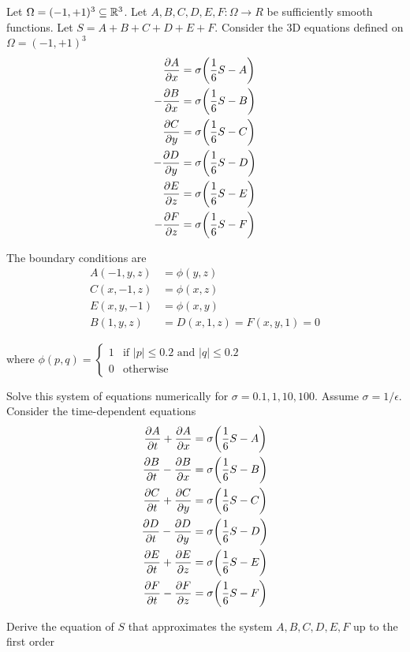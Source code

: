 \begin{problem}
	Let $\Omega = (-1, +1)^3 \subseteq \mathbb{R}^3$. Let $A, B, C, D, E, F: \Omega \to R$ be sufficiently smooth functions. Let $S = A + B + C + D + E + F$. Consider the 3D equations defined on $\Omega = (-1, +1)^3$
	\begin{align*}
		\frac{\partial A}{\partial x} &= \sigma \tuple*{\frac{1}{6} S - A} \\
		- \frac{\partial B}{\partial x} &= \sigma \tuple*{\frac{1}{6} S - B} \\
		\frac{\partial C}{\partial y} &= \sigma \tuple*{\frac{1}{6} S - C} \\
		- \frac{\partial D}{\partial y} &= \sigma \tuple*{\frac{1}{6} S - D} \\
		\frac{\partial E}{\partial z} &= \sigma \tuple*{\frac{1}{6} S - E} \\
		- \frac{\partial F}{\partial z} &= \sigma \tuple*{\frac{1}{6} S - F}
	\end{align*}
	
	The boundary conditions are 
	\begin{align*}
		A(-1, y, z) &= \phi(y, z) \\
		C(x, -1, z) &= \phi(x, z) \\
		E(x, y, -1) &= \phi(x, y) \\
		B(1, y, z) &= D(x, 1, z) = F(x, y, 1) = 0
	\end{align*}
	
	where $\phi(p, q) = \begin{cases}
		1 &\text{if $|p| \leq 0.2$ and $|q| \leq 0.2$} \\
		0 &\text{otherwise}
	\end{cases}$

	Solve this system of equations numerically for $\sigma = 0.1, 1, 10, 100$. Assume $\sigma = 1/\epsilon$. Consider the time-dependent equations
	\begin{align*}
		\frac{\partial A}{\partial t} + \frac{\partial A}{\partial x} &= \sigma \tuple*{\frac{1}{6} S - A} \\
		\frac{\partial B}{\partial t} - \frac{\partial B}{\partial x} &= \sigma \tuple*{\frac{1}{6} S - B} \\
		\frac{\partial C}{\partial t} + \frac{\partial C}{\partial y} &= \sigma \tuple*{\frac{1}{6} S - C} \\
		\frac{\partial D}{\partial t} - \frac{\partial D}{\partial y} &= \sigma \tuple*{\frac{1}{6} S - D} \\
		\frac{\partial E}{\partial t} + \frac{\partial E}{\partial z} &= \sigma \tuple*{\frac{1}{6} S - E} \\
		\frac{\partial F}{\partial t} - \frac{\partial F}{\partial z} &= \sigma \tuple*{\frac{1}{6} S - F}
	\end{align*}

	Derive the equation of $S$ that approximates the system $A, B, C, D, E, F$ up to the first order
		
\end{problem}

